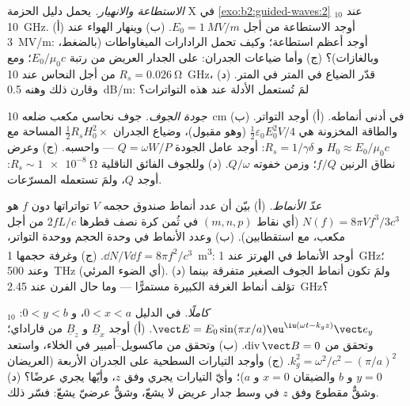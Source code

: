 \begin{exercise}[$\star\star$]\label{exo:b2:guided-waves:7}
\emph{الاستطاعة والانهيار.} يحمل دليل الحزمة X في \cref{exo:b2:guided-waves:2}
$_{10}$ عند \qty{10}{GHz}. (أ) أوجد الاستطاعة من أجل $E_0 = \qty{1}{MV/m}$. (ب) وينهار
الهواء عند \qty{3}{MV/m}: أوجد أعظم استطاعة؛ وكيف تحمل الرادارات
الميغاواطات (بالضغط، وبالغازات)؟ (ج) وأما ضياعات الجدران: 
على الجدار العريض من رتبة $E_0/\mu_0c$؛ ومع $R_s = \qty{0.026}{\ohm}$ من أجل
النحاس عند \qty{10}{GHz}، قدّر الضياع في المتر 
 في المتر. (د) وقارن ذلك  وهنه \qty{0.5}{dB/m}: لمَ تُستعمل
الأدلة عند هذه التواترات؟
\end{exercise}

\begin{exercise}[$\star\star$]\label{exo:b2:guided-waves:8}
\emph{جودة الجوف.} جوف نحاسي مكعب ضلعه \qty{10}{cm} في
أدنى أنماطه. (أ) أوجد التواتر. (ب) والطاقة المخزونة هي $\tfrac12\varepsilon_0E_0^2V/4$
(وهو مقبول)، وضياع الجدران $\tfrac12R_sH_0^2\times$ المساحة مع $H_0 \approx E_0/
\mu_0c$ و $R_s = 1/\gamma\delta$: أوجد عامل الجودة $Q = \omega W/P$ --- واحسبه.
(ج) وعرض نطاق الرنين $f/Q$؛ وزمن خفوته $Q/\omega$. (د) وللجوف
الفائق الناقلية $R_s \sim \qty{1e-8}{\ohm}$: أوجد $Q$، ولمَ
تستعمله المسرّعات.
\end{exercise}

\begin{exercise}[$\star\star$]\label{exo:b2:guided-waves:9}
\emph{عدّ الأنماط.} (أ) بيّن أن عدد أنماط صندوق
حجمه $V$ تواتراتها دون $f$ هو $N(f) = 8\pi Vf^3/3c^3$ (أي نقاط
$(m, n, p)$ في ثُمن كرة نصف قطرها $2fL/c$ من أجل مكعب، مع
استقطابين). (ب) وعدد الأنماط في وحدة الحجم ووحدة التواتر،
$\dd N/V\dd f = 8\pi f^2/c^3$. (ج) وغرفة حجمها \qty{1}{m^3}: أوجد الأنماط في الهرتز عند
\qty{1}{GHz}؛ وعند \qty{500}{THz} (أي الضوء المرئي). (د) ولمَ تكون أنماط الجوف
الصغير متفرقة بينما تؤلف أنماط الغرفة الكبيرة مستمرًّا --- وما
حال الفرن عند \qty{2.45}{GHz}؟
\end{exercise}

\begin{exercise}[$\star\star\star$]\label{exo:b2:guided-waves:10}
\emph{$_{10}$ كاملًا.} في الدليل $0 < x < a$، و $0 < y < b$: $\vect E =
E_0\sin(\pi x/a)\eu^{\iu(\omega t - k_gz)}\vect e_y$. (أ) أوجد $\underline B_x$
و $\underline B_z$ من فاراداي؛ وتحقق من $\operatorname{div}\vect B = 0$. (ب) وتحقق من ماكسويل--أمبير
في الخلاء، واستعد $k_g^2 = \omega^2/c^2 - (\pi/a)^2$. (ج) وأوجد التيارات السطحية
على الجدران الأربعة (العريضان $y = 0$ و $b$ والضيقان $x = 0$
و $a$)؛ وأيّ التيارات يجري وفق $z$، وأيّها يجري عرضًا؟ (د) وشقٌّ مقطوع وفق
$z$ في وسط جدار عريض لا يشعّ، وشقٌّ عرضيّ يشعّ:
فسّر ذلك.
\end{exercise}

